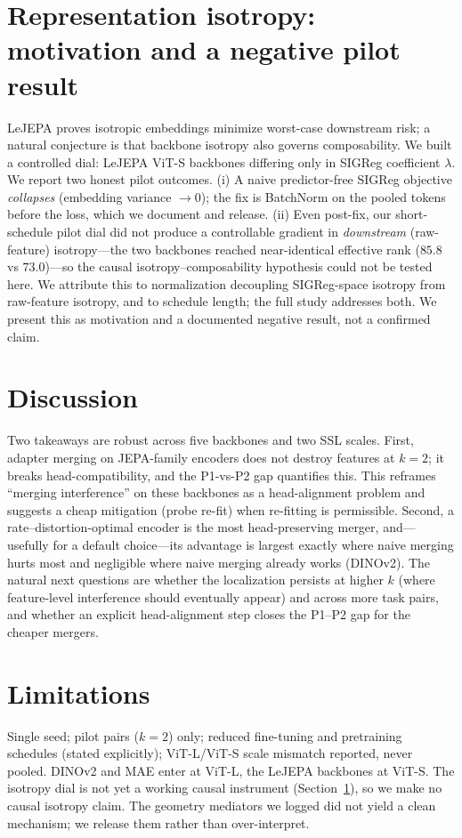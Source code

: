 \documentclass{article}
\begin{document}
\section{Representation isotropy: motivation and a negative pilot result}
\label{sec:iso}
LeJEPA proves isotropic embeddings minimize worst-case downstream risk; a
natural conjecture is that backbone isotropy also governs composability. We
built a controlled dial: LeJEPA ViT-S backbones differing only in SIGReg
coefficient $\lambda$. We report two honest pilot outcomes. (i) A naive
predictor-free SIGReg objective \emph{collapses} (embedding variance
$\to0$); the fix is BatchNorm on the pooled tokens before the loss, which we
document and release. (ii) Even post-fix, our short-schedule pilot dial did
not produce a controllable gradient in \emph{downstream} (raw-feature)
isotropy---the two backbones reached near-identical effective rank
($85.8$ vs $73.0$)---so the causal isotropy--composability hypothesis could
not be tested here. We attribute this to normalization decoupling
SIGReg-space isotropy from raw-feature isotropy, and to schedule length; the
full study addresses both. We present this as motivation and a documented
negative result, not a confirmed claim.

\section{Discussion}
Two takeaways are robust across five backbones and two SSL scales. First,
adapter merging on JEPA-family encoders does not destroy features at $k{=}2$;
it breaks head-compatibility, and the P1-vs-P2 gap quantifies this. This
reframes ``merging interference'' on these backbones as a head-alignment
problem and suggests a cheap mitigation (probe re-fit) when re-fitting is
permissible. Second, a rate--distortion-optimal encoder is the most
head-preserving merger, and---usefully for a default choice---its advantage is
largest exactly where naive merging hurts most and negligible where naive
merging already works (DINOv2). The natural next questions are whether the
localization persists at higher $k$ (where feature-level interference should
eventually appear) and across more task pairs, and whether an explicit
head-alignment step closes the P1--P2 gap for the cheaper mergers.

\section{Limitations}
Single seed; pilot pairs ($k{=}2$) only; reduced fine-tuning and pretraining
schedules (stated explicitly); ViT-L/ViT-S scale mismatch reported, never
pooled. DINOv2 and MAE enter at ViT-L, the LeJEPA backbones at ViT-S. The
isotropy dial is not yet a working causal instrument (Section~\ref{sec:iso}),
so we make no causal isotropy claim. The geometry mediators we logged did not
yield a clean mechanism; we release them rather than over-interpret.
\end{document}
